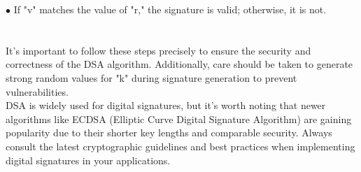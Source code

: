 \documentclass{report}
\begin{document}
$\bullet$ If "v" matches the value of "r," the signature is valid; otherwise, it is not.\\
\\
\\
It's important to follow these steps precisely to ensure the security and correctness of the DSA algorithm. Additionally, care should be taken to generate strong random values for "k" during signature generation to prevent vulnerabilities.\\
DSA is widely used for digital signatures, but it's worth noting that newer algorithms like ECDSA (Elliptic Curve Digital Signature Algorithm) are gaining popularity due to their shorter key lengths and comparable security. Always consult the latest cryptographic guidelines and best practices when implementing digital signatures in your applications.
\end{document}

